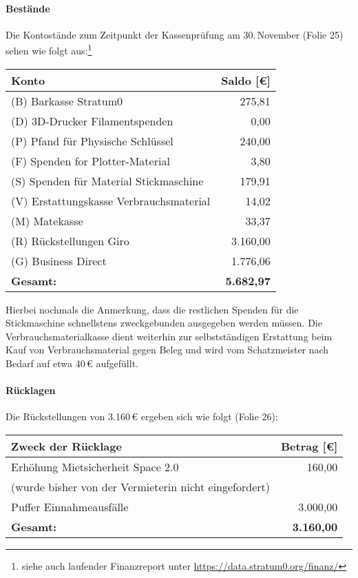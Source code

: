 \documentclass{s0minutes}
\begin{document}
\paragraph{Bestände}
Die Kontostände zum Zeitpunkt der Kassenprüfung am 30.\,November (Folie 25)
sehen wie folgt aus:\footnote{siehe auch laufender Finanzreport unter
\url{https://data.stratum0.org/finanz/}}

\begin{center}
\begin{tabular}{lr}
  \textbf{Konto} & \textbf{Saldo [€]} \\
  \midrule
  (B) Barkasse Stratum0                    &     275{,}81 \\
  (D) 3D-Drucker Filamentspenden           &       0{,}00 \\
  (P) Pfand für Physische Schlüssel        &     240{,}00 \\
  (F) Spenden for Plotter-Material         &       3{,}80 \\
  (S) Spenden für Material Stickmaschine   &     179{,}91 \\
  (V) Erstattungskasse Verbrauchsmaterial  &      14{,}02 \\
  (M) Matekasse                            &      33{,}37 \\
  (R) Rückstellungen Giro                  & 3{.}160{,}00 \\
  (G) Business Direct                      & 1{.}776{,}06 \\
  \midrule
  \textbf{Gesamt:}                 & \textbf{5{.}682{,}97} \\
\end{tabular}
\end{center}

Hierbei nochmals die Anmerkung, dass die restlichen Spenden für die Stickmaschine
schnellstens zweckgebunden ausgegeben werden müssen. Die Verbrauchsmaterialkasse
dient weiterhin zur selbstständigen Erstattung beim Kauf von Verbrauchsmaterial
gegen Beleg und wird vom Schatzmeister nach Bedarf auf etwa 40\,€ aufgefüllt.

\paragraph{Rücklagen}
Die Rückstellungen von 3{.}160\,€ ergeben sich wie folgt (Folie 26):

\begin{center}
\begin{tabular}{lr}
  \textbf{Zweck der Rücklage} & \textbf{Betrag [€]} \\
  \midrule
  Erhöhung Mietsicherheit Space 2.0 &     160{,}00 \\
  \qquad (wurde bisher von der Vermieterin nicht eingefordert) & \\
  Puffer Einnahmeausfälle           & 3{.}000{,}00 \\
  \midrule
  \textbf{Gesamt:}          & \textbf{3{.}160{,}00} \\
\end{tabular}
\end{center}
\end{document}
